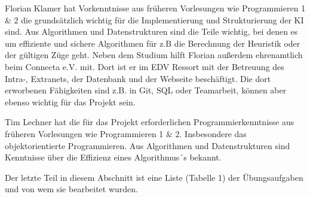 \documentclass[12pt,a4paper,bibliography=totocnumbered,listof=totocnumbered]{scrartcl}
\begin{document}
    Florian Klamer hat Vorkenntnisse aus früheren Vorlesungen wie Programmieren 1 \& 2 die grundsätzlich wichtig für die Implementierung und Strukturierung der KI sind. Aus Algorithmen und Datenstrukturen sind die Teile wichtig, bei denen es um effiziente und sichere Algorithmen für z.B die Berechnung der Heuristik oder der gültigen Züge geht. Neben dem Studium hilft Florian außerdem ehrenamtlich beim Connecta e.V. mit. Dort ist er im EDV Ressort mit der Betreuung des Intra-, Extranets, der Datenbank und der Webseite beschäftigt. Die dort erworbenen Fähigkeiten sind z.B. in Git, SQL oder Teamarbeit, können aber ebenso wichtig für das Projekt sein.

    Tim Lechner hat die für das Projekt erforderlichen Programmierkenntnisse aus früheren Vorlesungen wie Programmieren 1 \& 2. Insbesondere das objektorientierte Programmieren. Aus Algorithmen und Datenstrukturen sind Kenntnisse über die Effizienz eines Algorithmus´s bekannt.  
    

    Der letzte Teil in diesem Abschnitt ist eine Liste (Tabelle 1) der Übungsaufgaben und von wem sie bearbeitet wurden.
\end{document}
